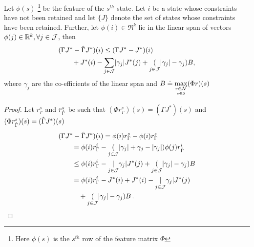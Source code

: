 \begin{theorem}
Let $\phi(s)$%
\footnote{Here $\phi(s)$ is the $s^{th}$ row of the feature matrix $\Phi$} be the feature of the $s^{th}$ state. Let $i$ be a state whose constraints have not been retained and let $\{J\}$ denote the set of states whose constraints have been retained. Further, let $\phi(i)\in \Re^k$ lie in the linear span of vectors $\phi(j)\in \mathbb{R}^k,\forall j\in \mathcal{J}$, then
\begin{align*}
\MoveEqLeft (\Gamma J^*-\hg J^*)(i)
 \leq 
(\Gamma J^*-J^*)(i) \\
& {}+J^*(i)-\underset{j\in \J}{\sum} |\gamma_j| J^*(j)
+ \underset{j\in \J}(|\gamma_j|-\gamma_j) B,
\end{align*}
where $\gamma_j$ are the co-efficients of the linear span and $B\doteq \underset{\underset{s\in S}{r\in \mathcal{N}}}{\max}(\Phi r) (s)$
\end{theorem}
\begin{proof}
Let $r^s_{\Gamma}$ and $r^s_{\hat{\Gamma}}$ be such that $(\Phi r^s_{\Gamma})(s)=(\Gamma J^*)(s)$ and $(\Phi r^s_{\hat{\Gamma}})(s)=(\hat{\Gamma} J^*)(s)$
\begin{align*}
\MoveEqLeft (\Gamma J^*-\hg J^*)(i) 
=\phi(i) r^s_{\Gamma}- \phi(i) r^s_{\Gamma}\\
&=\phi(i) r^i_{\Gamma}- \underset{j\in \J}(|\gamma_j|+\gamma_j -|\gamma_j|)\phi(j) r^i_{\hg}\\
&\leq \phi(i) r^i_{\Gamma}- \underset{j\in \J}|\gamma_j| J^*(j) + \underset{j\in \J} (|\gamma_j|-\gamma_j)B\\
&= \phi(i) r^i_{\Gamma}- J^*(i)+ J^*(i) -\underset{j\in \J}|\gamma_j| J^*(j) \\
& \quad + \underset{j\in \J} (|\gamma_j|-\gamma_j)B\,.
\end{align*}
\end{proof}
